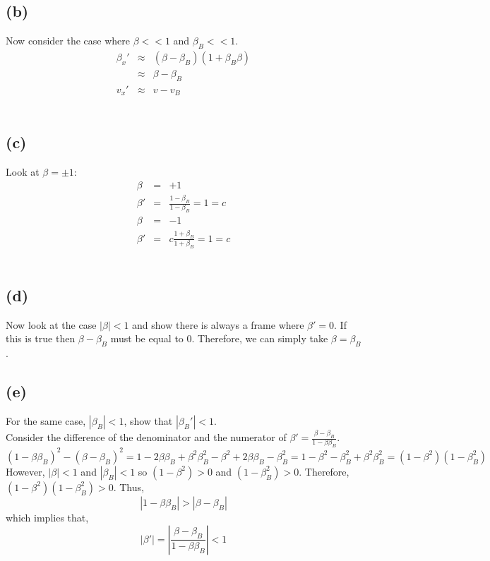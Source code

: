 \documentclass[11pt]{amsart}
\begin{document}
\subsection*{(b)} Now consider the case where $\beta<<1$ and $\beta_{B}<<1$. \\
\begin{eqnarray*}
\beta_{x}' &\approx& (\beta-\beta_{B})(1+\beta_{B}\beta) \\
&\approx& \beta-\beta_{B} \\
v_{x}' &\approx& v-v_{B} 
\end{eqnarray*} \\
\subsection*{(c)} Look at $\beta=\pm{1}$: \\
\begin{eqnarray*}
\beta &=& +1 \\
\beta' &=& \frac{1-\beta_{B}}{1-\beta_{B}} = 1 = c\\
\beta &=& -1 \\
\beta' &=&c\frac{1+\beta_{B}}{1+\beta_{B}} = 1 = c 
\end{eqnarray*} \\
\subsection*{(d)} Now look at the case $|\beta|<1$ and show there is always a frame where $\beta'=0$. If this is true then $\beta-\beta_{B}$ must be equal to 0. Therefore, we can simply take $\beta=\beta_{B}$. \\
\subsection*{(e)} For the same case, $|\beta_{B}|<1$, show that $|\beta_{B}'|<1$. \\
Consider the difference of the denominator and the numerator of $\beta' = \frac{\beta - \beta_B}{1 - \beta \beta_B}$. 
\[(1 - \beta \beta_B)^2 - (\beta - \beta_B)^2 = 1 - 2 \beta \beta_B + \beta^2 \beta_B^2 - \beta^2 + 2 \beta \beta_B - \beta_B^2 = 1 - \beta^2 - \beta_B^2 + \beta^2 \beta_B^2 = (1 - \beta^2)(1 - \beta_B^2)\]
However, $|\beta| < 1$ and $|\beta_B| < 1$ so $(1 - \beta^2) > 0$ and $(1 - \beta_B^2) > 0$. Therefore, $(1 - \beta^2)(1 - \beta_B^2) > 0$. Thus,
\[|1 - \beta \beta_B| > |\beta - \beta_B|\]
which implies that,
\[|\beta'| = \left| \frac{\beta - \beta_B}{1 - \beta \beta_B} \right| < 1\]
\end{document}
